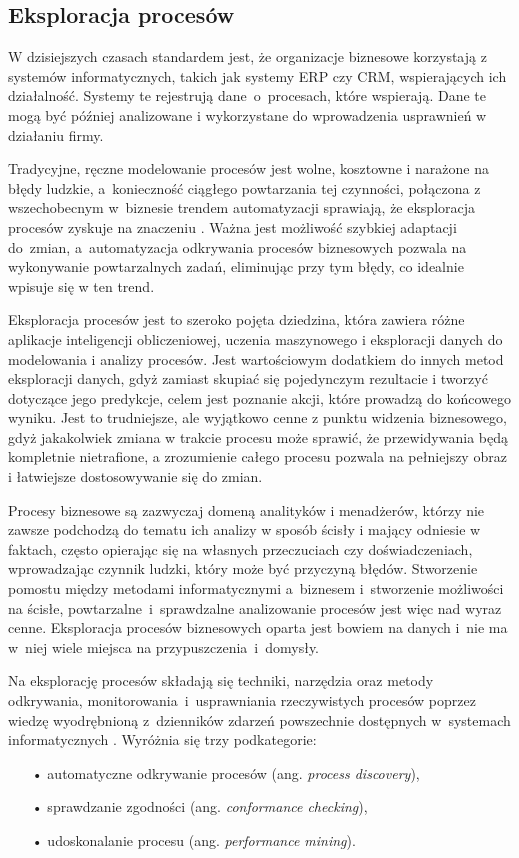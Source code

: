 \subsection{Eksploracja procesów}

W dzisiejszych czasach standardem jest, że organizacje biznesowe korzystają z systemów informatycznych, takich jak systemy ERP czy CRM, wspierających ich działalność. Systemy te rejestrują dane~o~procesach, które wspierają. Dane te mogą być później analizowane i wykorzystane do wprowadzenia usprawnień w działaniu firmy.   

Tradycyjne, ręczne modelowanie procesów jest wolne, kosztowne i narażone na błędy ludzkie, a~konieczność ciągłego powtarzania tej czynności, połączona z wszechobecnym w~biznesie trendem automatyzacji sprawiają, że eksploracja procesów zyskuje na znaczeniu \cite{market-pm}. Ważna jest możliwość szybkiej adaptacji do~zmian, a~automatyzacja odkrywania procesów biznesowych pozwala na wykonywanie powtarzalnych zadań, eliminując przy tym błędy, co idealnie wpisuje się w ten trend.

Eksploracja procesów jest to szeroko pojęta dziedzina, która zawiera różne aplikacje inteligencji obliczeniowej, uczenia maszynowego i eksploracji danych do modelowania i analizy procesów. 
Jest wartościowym dodatkiem do innych metod eksploracji danych, gdyż zamiast skupiać się pojedynczym rezultacie i tworzyć dotyczące jego predykcje, celem jest poznanie akcji, które prowadzą do końcowego wyniku. Jest to trudniejsze, ale wyjątkowo cenne z punktu widzenia biznesowego, gdyż jakakolwiek zmiana w trakcie procesu może sprawić, że przewidywania będą kompletnie nietrafione, a  zrozumienie całego procesu pozwala na pełniejszy obraz i łatwiejsze dostosowywanie się do zmian. 

Procesy biznesowe są zazwyczaj domeną analityków i menadżerów, którzy nie zawsze podchodzą do tematu ich analizy w sposób ścisły i mający odniesie w faktach, często opierając się na własnych przeczuciach czy doświadczeniach, wprowadzając czynnik ludzki, który może być przyczyną błędów. Stworzenie pomostu między metodami informatycznymi a~biznesem i~stworzenie możliwości na ścisłe, powtarzalne~i~sprawdzalne analizowanie procesów jest więc nad wyraz cenne. Eksploracja procesów biznesowych oparta jest bowiem na danych i~nie ma w~niej wiele miejsca na przypuszczenia~i~domysły.

Na eksplorację procesów składają się techniki, narzędzia oraz metody odkrywania, monitorowania~i~usprawniania rzeczywistych procesów poprzez wiedzę wyodrębnioną z~dzienników zdarzeń powszechnie dostępnych w~systemach informatycznych \cite{pm-manifesto, mining-overview}.
Wyróżnia się trzy podkategorie: 
\begin{itemize}
  \item[•] automatyczne odkrywanie procesów (ang. \textit{process discovery}),
  \item[•] sprawdzanie zgodności (ang. \textit{conformance checking}),
  \item[•] udoskonalanie procesu (ang. \textit{performance mining}).
\end{itemize}


